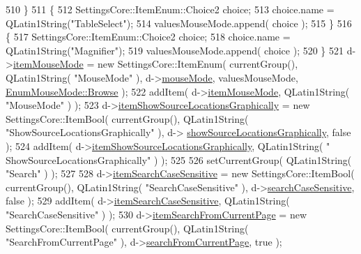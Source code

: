 \begin{DoxyCode}
510   \}
511   \{
512     SettingsCore::ItemEnum::Choice2 choice;
513     choice.name = QLatin1String(\textcolor{stringliteral}{"TableSelect"});
514     valuesMouseMode.append( choice );
515   \}
516   \{
517     SettingsCore::ItemEnum::Choice2 choice;
518     choice.name = QLatin1String(\textcolor{stringliteral}{"Magnifier"});
519     valuesMouseMode.append( choice );
520   \}
521   d->\hyperlink{classOkular_1_1SettingsPrivate_ae13f858f8dd1e530090ff4f063632dcd}{itemMouseMode} = \textcolor{keyword}{new} SettingsCore::ItemEnum( currentGroup(), QLatin1String( \textcolor{stringliteral}{"MouseMode"} ),
       d->\hyperlink{classOkular_1_1SettingsPrivate_a38b266f564e758f5a0634b3e56f4d7d6}{mouseMode}, valuesMouseMode, \hyperlink{classOkular_1_1Settings_1_1EnumMouseMode_ab2ae04e2d7d069f02195ccf32c52415bae5c77f74b0cf35d7838da1baaad4e822}{EnumMouseMode::Browse} );
522   addItem( d->\hyperlink{classOkular_1_1SettingsPrivate_ae13f858f8dd1e530090ff4f063632dcd}{itemMouseMode}, QLatin1String( \textcolor{stringliteral}{"MouseMode"} ) );
523   d->\hyperlink{classOkular_1_1SettingsPrivate_a52a3dd610296e632468dd63ed3d165fe}{itemShowSourceLocationsGraphically} = \textcolor{keyword}{new} SettingsCore::ItemBool( 
      currentGroup(), QLatin1String( \textcolor{stringliteral}{"ShowSourceLocationsGraphically"} ), d->
      \hyperlink{classOkular_1_1SettingsPrivate_af23f52eb1e6c8cf84cbbe9683b9866ed}{showSourceLocationsGraphically}, \textcolor{keyword}{false} );
524   addItem( d->\hyperlink{classOkular_1_1SettingsPrivate_a52a3dd610296e632468dd63ed3d165fe}{itemShowSourceLocationsGraphically}, QLatin1String( \textcolor{stringliteral}{"
      ShowSourceLocationsGraphically"} ) );
525 
526   setCurrentGroup( QLatin1String( \textcolor{stringliteral}{"Search"} ) );
527 
528   d->\hyperlink{classOkular_1_1SettingsPrivate_aadab39c61d1860215823fbc1ce76e3b0}{itemSearchCaseSensitive} = \textcolor{keyword}{new} SettingsCore::ItemBool( currentGroup(), 
      QLatin1String( \textcolor{stringliteral}{"SearchCaseSensitive"} ), d->\hyperlink{classOkular_1_1SettingsPrivate_a8efa1f3ff95b35de3918e7d50c65af13}{searchCaseSensitive}, \textcolor{keyword}{false} );
529   addItem( d->\hyperlink{classOkular_1_1SettingsPrivate_aadab39c61d1860215823fbc1ce76e3b0}{itemSearchCaseSensitive}, QLatin1String( \textcolor{stringliteral}{"SearchCaseSensitive"} ) );
530   d->\hyperlink{classOkular_1_1SettingsPrivate_aa251d7a638d4cd802c4f69c8e70a3bd4}{itemSearchFromCurrentPage} = \textcolor{keyword}{new} SettingsCore::ItemBool( currentGroup(), 
      QLatin1String( \textcolor{stringliteral}{"SearchFromCurrentPage"} ), d->\hyperlink{classOkular_1_1SettingsPrivate_a79e1f0ced04bb9073d77c1e442aebc8f}{searchFromCurrentPage}, \textcolor{keyword}{true} );

\end{DoxyCode}
